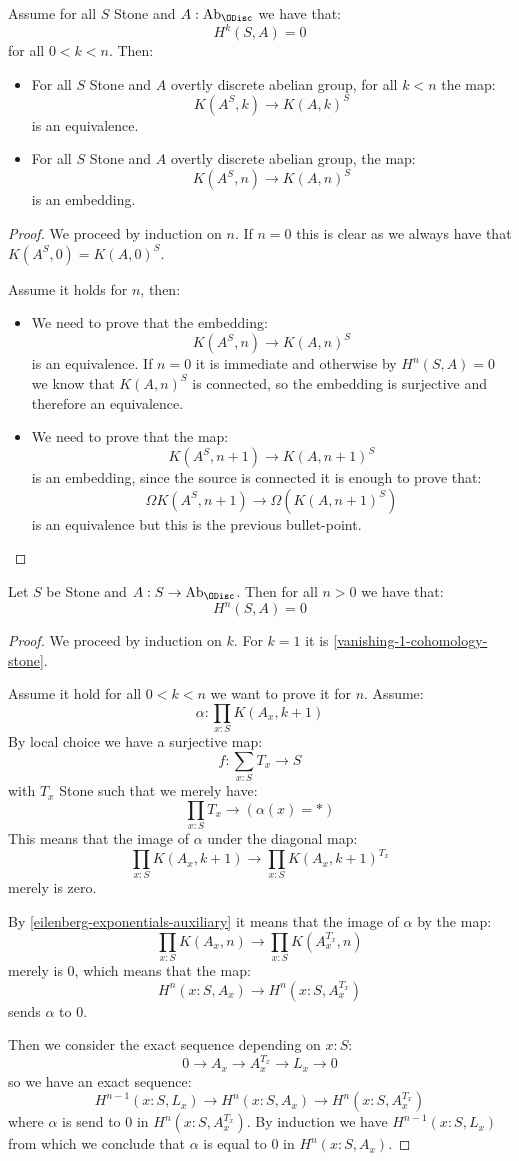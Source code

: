 \begin{lemma}\label{eilenberg-exponentials-auxiliary}
Assume for all $S$ Stone and $A:\mathrm{Ab}_\ODisc$ we have that:
\[H^k(S,A) = 0\] 
for all $0<k<n$. Then:
\begin{itemize}
\item For all $S$ Stone and $A$ overtly discrete abelian group, for all $k<n$ the map:
\[K(A^S,k) \to K(A,k)^S\]
is an equivalence.
\item For all $S$ Stone and $A$ overtly discrete abelian group, the map:
\[K(A^S,n) \to K(A,n)^S\]
is an embedding.
\end{itemize}
\end{lemma}

\begin{proof}
We proceed by induction on $n$. If $n=0$ this is clear as we always have that $K(A^S,0) = K(A,0)^S$.

Assume it holds for $n$, then:
\begin{itemize} 
\item We need to prove that the embedding:
\[K(A^S,n) \to K(A,n)^S\]
is an equivalence. If $n=0$ it is immediate and otherwise by $H^n(S,A)=0$ we know that $K(A,n)^S$ is connected, so the embedding is surjective and therefore an equivalence. 
\item We need to prove that the map:
\[K(A^S,n+1) \to K(A,n+1)^S\]
is an embedding, since the source is connected it is enough to prove that:
\[\Omega K(A^S,n+1) \to \Omega (K(A,n+1)^S)\]
is an equivalence but this is the previous bullet-point.
\end{itemize}
\end{proof}

\begin{theorem}\label{vanishing-cohomology-stone}
Let $S$ be Stone and $A:S\to\mathrm{Ab}_\ODisc$. Then for all $n>0$ we have that:
\[H^n(S,A) = 0\]
\end{theorem}

\begin{proof}
We proceed by induction on $k$. For $k=1$ it is \cref{vanishing-1-cohomology-stone}.

Assume it hold for all $0<k<n$ we want to prove it for $n$. Assume:
\[\alpha : \prod_{x:S} K(A_x,k+1)\]
By local choice we have a surjective map:
\[f:\sum_{x:S}T_x\to S\]
with $T_x$ Stone such that we merely have:
\[\prod_{x:S} T_x\to (\alpha(x) = *)\]
This means that the image of $\alpha$ under the diagonal map:
\[\prod_{x:S} K(A_x,k+1) \to \prod_{x:S} K(A_x,k+1)^{T_x}\]
merely is zero.

By \cref{eilenberg-exponentials-auxiliary} it means that the image of $\alpha$ by the map:
\[\prod_{x:S} K(A_x,n) \to \prod_{x:S} K(A_x^{T_x},n)\]
merely is $0$, which means that the map:
\[H^{n}(x:S,A_x) \to H^{n}(x:S,A_x^{T_x})\]
sends $\alpha$ to $0$. 

Then we consider the exact sequence depending on $x:S$:
\[0\to A_x\to A_x^{T_x}\to L_x\to 0\]
so we have an exact sequence: 
\[H^{n-1}(x:S,L_x)\to H^n(x:S,A_x)\to H^n(x:S,A_x^{T_x})\]
where $\alpha$ is send to $0$ in $H^n(x:S,A_x^{T_x})$. By induction we have $H^{n-1}(x:S,L_x)$ from which we conclude that $\alpha$ is equal to $0$ in $H^n(x:S,A_x)$.
\end{proof}


